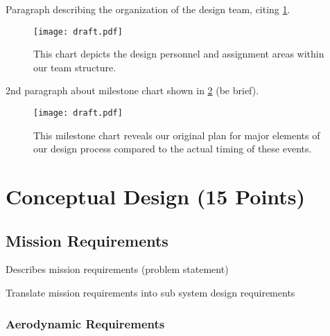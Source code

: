 \documentclass[report]{byu-aero}
\begin{document}
Paragraph describing the organization of the design team, citing \cref{fig:personnelassignments}.

\begin{figure}[h!]
	\centering
	\texttt{[image: draft.pdf]}
	\caption{This chart depicts the design personnel and assignment areas within our team structure.}
	\label{fig:personnelassignments}
\end{figure}

2nd paragraph about milestone chart shown in  \cref{fig:plannedvsactualtiming} (be brief).

\begin{figure}[h!]
	\centering
	\texttt{[image: draft.pdf]}
	\caption{This milestone chart reveals our original plan for major elements of our design process compared to the actual timing of these events.}
	\label{fig:plannedvsactualtiming}
\end{figure}

\section{Conceptual Design (15 Points)} %
\label{sec:ConceptualDesign}

\subsection{Mission Requirements}
\label{ssec:missionreqs}

Describes mission requirements (problem statement)

Translate mission requirements into sub system design requirements
\subsubsection{Aerodynamic Requirements}
\label{sssec:aeroreqs}
\end{document}

